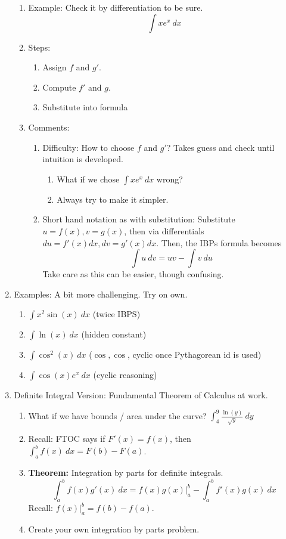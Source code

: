 \documentclass{article}
\newcommand{\ds}{\displaystyle}
\begin{document}
\begin{enumerate}
\begin{enumerate}
\item Example: Check it by differentiation to be sure.
$$
\int xe^x ~dx
$$
\item Steps:
\begin{enumerate}
\item Assign $f$ and $g'$.
\item Compute $f'$ and $g$.
\item Substitute into formula
\end{enumerate}
\item Comments:
\begin{enumerate}
\item Difficulty: How to choose $f$ and $g'$? Takes guess and check until intuition is developed. 
\begin{enumerate}
\item What if we chose $\int xe^x ~dx$ wrong?
\item Always try to make it simpler.
\end{enumerate}
\item Short hand notation as with substitution: Substitute $u=f(x), v=g(x)$, then via differentials $du = f'(x)dx, dv = g'(x)dx$. Then, the IBPs formula becomes
\[
\int u~dv = uv - \int v~du
\]
Take care as this can be easier, though confusing.
\end{enumerate}
\end{enumerate}

\item Examples: A bit more challenging. Try on own.
\begin{enumerate}
\item $\int x^2 \sin(x) ~dx$ (twice IBPS)
\item $\int \ln(x) ~dx$ (hidden constant)
\item $\int \cos^2(x) ~dx$ ($\cos,\cos$, cyclic once Pythagorean id is used)
\item $\int \cos(x)e^x ~dx$ (cyclic reasoning)
\end{enumerate}

\item Definite Integral Version: Fundamental Theorem of Calculus at work.
\begin{enumerate}
\item What if we have bounds / area under the curve? $ \ds \int_4^9 \frac{\ln(y)}{\sqrt{y}}~dy$
\item Recall: FTOC says if $F'(x) = f(x)$, then $\int_a^b f(x)~dx = F(b)-F(a)$.
\item \textbf{Theorem:} Integration by parts for definite integrals.
$$\displaystyle\int_a^b f(x)g'(x)~dx = f(x)g(x)\Big|_a^b-\int_a^b f'(x)g(x)~dx$$
Recall: $f(x)\Big|_a^b = f(b)-f(a)$.
\item Create your own integration by parts problem.
\end{enumerate}
\end{enumerate}
\end{document}
